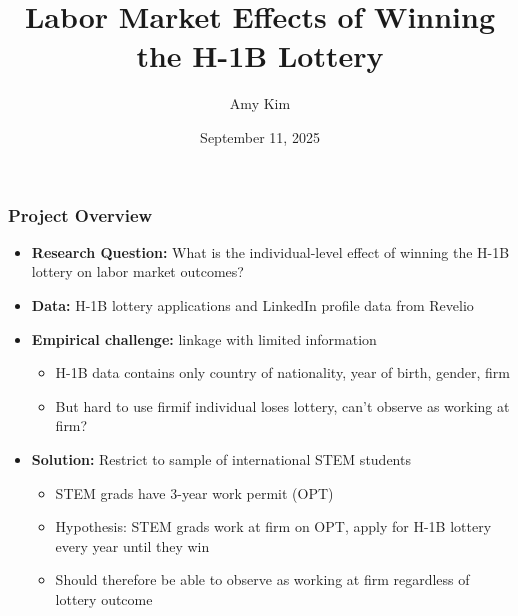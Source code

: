 \documentclass[xcolor=dvipsnames, compress, 12pt, aspectratio=169, handout]{beamer}
\title{Labor Market Effects of Winning the H-1B Lottery}
\author{Amy Kim}
\date{September 11, 2025}
\begin{document}
\begin{frame}[plain]
    \titlepage
    \addtocounter{framenumber}{-1}
\end{frame}

\begin{frame}
    \frametitle{Project Overview}
    \begin{itemize}
        \item \textbf{Research Question:} What is the individual-level effect of winning the H-1B lottery on labor market outcomes?
        \vspace{2mm}
        \item \textbf{Data:} H-1B lottery applications and LinkedIn profile data from Revelio
        \vspace{2mm}
        \item \textbf{Empirical challenge:} linkage with limited information 
        \begin{itemize}
            \item H-1B data contains only country of nationality, year of birth, gender, firm 
            \item But hard to use firm\textemdash if individual loses lottery, can't observe as working at firm?
        \end{itemize}
        \vspace{2mm}
        \item \textbf{Solution:} Restrict to sample of international STEM students 
        \begin{itemize}
            \item STEM grads have 3-year work permit (OPT)
            \item Hypothesis: STEM grads work at firm on OPT, apply for H-1B lottery every year until they win
            \item Should therefore be able to observe as working at firm regardless of lottery outcome
        \end{itemize}
    \end{itemize}
\end{frame}
\end{document}
